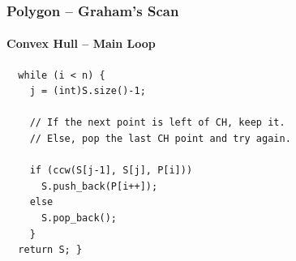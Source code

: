 \begin{frame}[fragile]
  \frametitle{Polygon -- Graham's Scan}
  \framesubtitle{Convex Hull -- Main Loop}

  {\small
    \begin{exampleblock}{}
\begin{verbatim}
  while (i < n) {
    j = (int)S.size()-1;

    // If the next point is left of CH, keep it.
    // Else, pop the last CH point and try again.

    if (ccw(S[j-1], S[j], P[i]))
      S.push_back(P[i++]);
    else
      S.pop_back();
    }
  return S; }
\end{verbatim}
\end{exampleblock}}
\end{frame}
